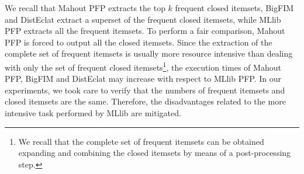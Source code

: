 
We recall that Mahout PFP extracts the top $k$ frequent closed itemsets, BigFIM
and DistEclat extract a superset of the frequent closed itemsets,
while MLlib PFP extracts all the frequent itemsets.
To perform a fair comparison, Mahout PFP is forced to output all the closed
itemsets.
Since the extraction of the complete set of frequent itemsets is usually
more resource intensive than dealing with only the set of frequent closed
itemsets\footnote{We recall that the complete set of frequent itemsets can be
obtained expanding and combining the closed itemsets by means of a
post-processing step.},
the execution times of Mahout PFP, BigFIM and DistEclat may increase with respect
to MLlib PFP.
In our experiments, we took care to verify that
the numbers of frequent itemsets and closed itemsets are the same.
Therefore, the disadvantages related to the more intensive task performed
by MLlib are mitigated.




